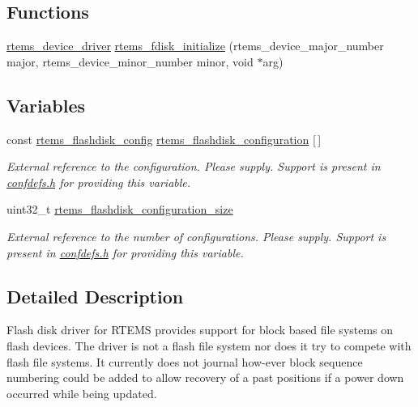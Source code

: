 \subsection*{Functions}
\begin{DoxyCompactItemize}
\item 
\mbox{\hyperlink{group__ClassicStatus_ga545d41846817eaba6143d52ee4d9e9fe}{rtems\+\_\+device\+\_\+driver}} \mbox{\hyperlink{group__RTEMSFDisk_ga38fc68a069082118de0f8b389fcd004b}{rtems\+\_\+fdisk\+\_\+initialize}} (rtems\+\_\+device\+\_\+major\+\_\+number major, rtems\+\_\+device\+\_\+minor\+\_\+number minor, void $\ast$arg)
\end{DoxyCompactItemize}
\subsection*{Variables}
\begin{DoxyCompactItemize}
\item 
\mbox{\label{group__RTEMSFDisk_ga68b00046a3d3c3b702ae52bcb3286651}} 
const \mbox{\hyperlink{structrtems__flashdisk__config}{rtems\+\_\+flashdisk\+\_\+config}} \mbox{\hyperlink{group__RTEMSFDisk_ga68b00046a3d3c3b702ae52bcb3286651}{rtems\+\_\+flashdisk\+\_\+configuration}} \mbox{[}$\,$\mbox{]}
\begin{DoxyCompactList}\small\item\em External reference to the configuration. Please supply. Support is present in \mbox{\hyperlink{confdefs_8h}{confdefs.\+h}} for providing this variable. \end{DoxyCompactList}\item 
\mbox{\label{group__RTEMSFDisk_ga6bc9f00bbbd031f76f3024fc91a4d0b0}} 
uint32\+\_\+t \mbox{\hyperlink{group__RTEMSFDisk_ga6bc9f00bbbd031f76f3024fc91a4d0b0}{rtems\+\_\+flashdisk\+\_\+configuration\+\_\+size}}
\begin{DoxyCompactList}\small\item\em External reference to the number of configurations. Please supply. Support is present in \mbox{\hyperlink{confdefs_8h}{confdefs.\+h}} for providing this variable. \end{DoxyCompactList}\end{DoxyCompactItemize}


\subsection{Detailed Description}
Flash disk driver for R\+T\+E\+MS provides support for block based file systems on flash devices. The driver is not a flash file system nor does it try to compete with flash file systems. It currently does not journal how-\/ever block sequence numbering could be added to allow recovery of a past positions if a power down occurred while being updated.

